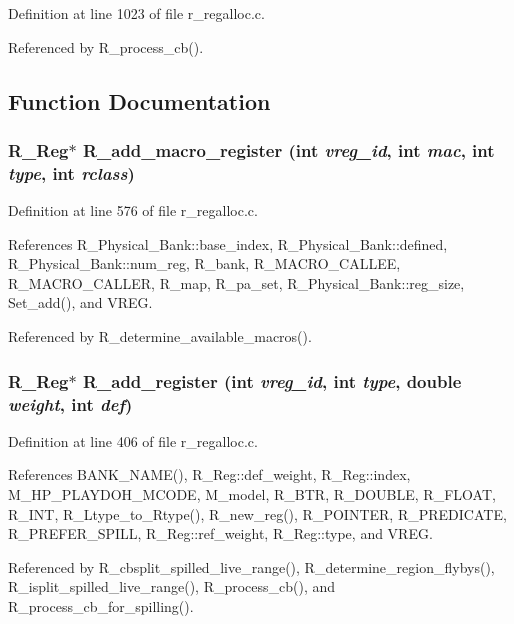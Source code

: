 Definition at line 1023 of file r\_\-regalloc.c.

Referenced by R\_\-process\_\-cb().

\subsection{Function Documentation}
\subsubsection{\setlength{\rightskip}{0pt plus 5cm}\bf{R\_\-Reg}$\ast$ R\_\-add\_\-macro\_\-register (int {\em vreg\_\-id}, int {\em mac}, int {\em type}, int {\em rclass})}\label{r__regalloc_8c_1e12fbd27bb841ddcd92e9be4fb282c9}




Definition at line 576 of file r\_\-regalloc.c.

References R\_\-Physical\_\-Bank::base\_\-index, R\_\-Physical\_\-Bank::defined, R\_\-Physical\_\-Bank::num\_\-reg, R\_\-bank, R\_\-MACRO\_\-CALLEE, R\_\-MACRO\_\-CALLER, R\_\-map, R\_\-pa\_\-set, R\_\-Physical\_\-Bank::reg\_\-size, Set\_\-add(), and VREG.

Referenced by R\_\-determine\_\-available\_\-macros().
\subsubsection{\setlength{\rightskip}{0pt plus 5cm}\bf{R\_\-Reg}$\ast$ R\_\-add\_\-register (int {\em vreg\_\-id}, int {\em type}, double {\em weight}, int {\em def})}\label{r__regalloc_8c_a5f0a31af36426f81ba06ef831aa0644}




Definition at line 406 of file r\_\-regalloc.c.

References BANK\_\-NAME(), R\_\-Reg::def\_\-weight, R\_\-Reg::index, M\_\-HP\_\-PLAYDOH\_\-MCODE, M\_\-model, R\_\-BTR, R\_\-DOUBLE, R\_\-FLOAT, R\_\-INT, R\_\-Ltype\_\-to\_\-Rtype(), R\_\-new\_\-reg(), R\_\-POINTER, R\_\-PREDICATE, R\_\-PREFER\_\-SPILL, R\_\-Reg::ref\_\-weight, R\_\-Reg::type, and VREG.

Referenced by R\_\-cbsplit\_\-spilled\_\-live\_\-range(), R\_\-determine\_\-region\_\-flybys(), R\_\-isplit\_\-spilled\_\-live\_\-range(), R\_\-process\_\-cb(), and R\_\-process\_\-cb\_\-for\_\-spilling().
